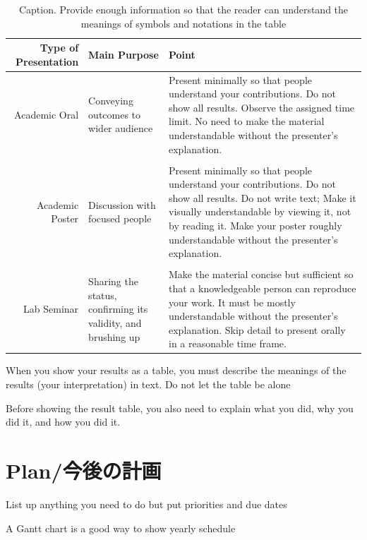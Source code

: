 \documentclass[]{lrlabreport}
\begin{document}
\begin{table}[H] %
    \centering
    \scriptsize
    \begin{tabularx}{\linewidth}{r|p{3cm}L}
    \toprule
      Type of Presentation & Main Purpose & Point \\
    \midrule
      Academic Oral & 
       Conveying outcomes to wider audience& 
       Present minimally so that
       people understand your contributions.
       Do not show all results.
       Observe the assigned time limit.
       No need to make the material understandable without the presenter's explanation. 
       \\
       \\
      Academic Poster & 
       Discussion with focused people & 
       Present minimally so that
       people understand your contributions.
       Do not show all results.
       Do not write text; Make it visually understandable by viewing it, not by reading it. 
       Make your poster roughly understandable without the presenter's explanation. 
       \\
       \\
      Lab Seminar &
       Sharing the status, confirming its validity, and brushing up &
       Make the material concise but sufficient so that a knowledgeable person can reproduce your work.
       It must be mostly understandable without the presenter's explanation. 
       Skip detail to present orally in a reasonable time frame.
       \\
    \bottomrule
    \end{tabularx}
    \caption{\footnotesize Caption. Provide enough information so that the reader can understand the meanings of symbols and notations in the table}
    \label{tab:type_of_presentations}
\end{table}

\I When you show your results as a table, you must describe the meanings of the results (your interpretation) in text. Do not let the table be alone

\I Before showing the result table, you also need to explain what you did, why you did it, and how you did it.


\section{Plan/今後の計画}

\I List up anything you need to do but put priorities and due dates

\I A Gantt chart is a good way to show yearly schedule


\footnotesize

\end{document}
